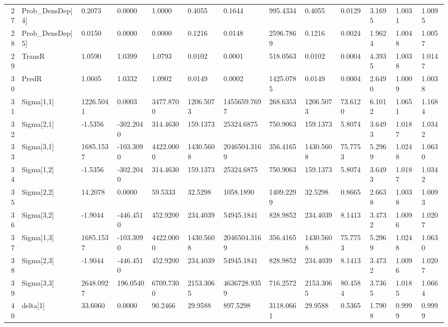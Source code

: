 \begin{table}[ht]
\begin{tabular}{rllllllllllll}
  27 & Prob\_DensDep[4] &    0.2073 &    0.0000 &    1.0000 &    0.4055 &       0.1644 &  995.4334 &    0.4055 &  0.0129 &  3.1695 & 1.0031 & 1.0095 \\ 
  28 & Prob\_DensDep[5] &    0.0150 &    0.0000 &    0.0000 &    0.1216 &       0.0148 & 2596.7869 &    0.1216 &  0.0024 &  1.9624 & 1.0048 & 1.0057 \\ 
  29 & TransR &    1.0590 &    1.0399 &    1.0793 &    0.0102 &       0.0001 &  518.0563 &    0.0102 &  0.0004 &  4.3935 & 1.0038 & 1.0147 \\ 
  30 & PredR &    1.0605 &    1.0332 &    1.0902 &    0.0149 &       0.0002 & 1425.0785 &    0.0149 &  0.0004 &  2.6490 & 1.0009 & 1.0038 \\ 
  31 & Sigma[1,1] & 1226.5041 &    0.0003 & 3477.8700 & 1206.5073 & 1455659.7697 &  268.6353 & 1206.5073 & 73.6120 &  6.1012 & 1.0651 & 1.1684 \\ 
  32 & Sigma[2,1] &   -1.5356 & -302.2040 &  314.4630 &  159.1373 &   25324.6875 &  750.9063 &  159.1373 &  5.8074 &  3.6493 & 1.0187 & 1.0342 \\ 
  33 & Sigma[3,1] & 1685.1537 & -103.3090 & 4422.0000 & 1430.5608 & 2046504.3169 &  356.4165 & 1430.5608 & 75.7753 &  5.2969 & 1.0248 & 1.0630 \\ 
  34 & Sigma[1,2] &   -1.5356 & -302.2040 &  314.4630 &  159.1373 &   25324.6875 &  750.9063 &  159.1373 &  5.8074 &  3.6493 & 1.0187 & 1.0342 \\ 
  35 & Sigma[2,2] &   14.2078 &    0.0000 &   59.5333 &   32.5298 &    1058.1890 & 1409.2299 &   32.5298 &  0.8665 &  2.6638 & 1.0038 & 1.0093 \\ 
  36 & Sigma[3,2] &   -1.9044 & -446.4510 &  452.9200 &  234.4039 &   54945.1841 &  828.9852 &  234.4039 &  8.1413 &  3.4732 & 1.0096 & 1.0207 \\ 
  37 & Sigma[1,3] & 1685.1537 & -103.3090 & 4422.0000 & 1430.5608 & 2046504.3169 &  356.4165 & 1430.5608 & 75.7753 &  5.2969 & 1.0248 & 1.0630 \\ 
  38 & Sigma[2,3] &   -1.9044 & -446.4510 &  452.9200 &  234.4039 &   54945.1841 &  828.9852 &  234.4039 &  8.1413 &  3.4732 & 1.0096 & 1.0207 \\ 
  39 & Sigma[3,3] & 2648.0927 &  196.0540 & 6709.7300 & 2153.3065 & 4636728.9359 &  716.2572 & 2153.3065 & 80.4584 &  3.7365 & 1.0185 & 1.0664 \\ 
  40 & delta[1] &   33.6060 &    0.0000 &   90.2466 &   29.9588 &     897.5298 & 3118.0661 &   29.9588 &  0.5365 &  1.7908 & 0.9999 & 0.9999 \\ 

\end{tabular}
\end{table}
